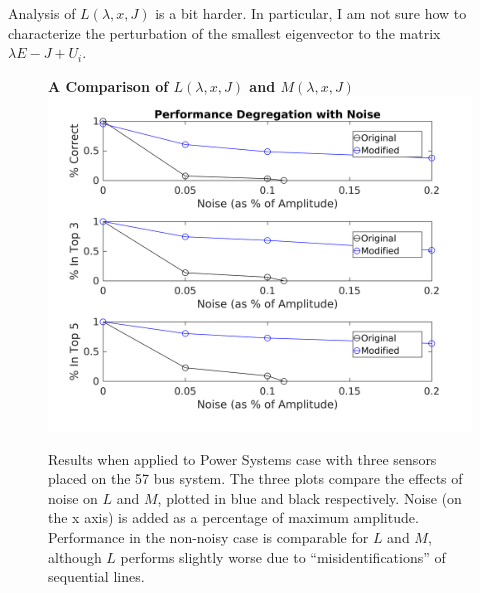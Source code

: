 Analysis of $L(\lambda, x, J)$ is a bit harder. In particular, I am not sure how to characterize the perturbation of the smallest eigenvector to the matrix $\lambda E - J + U_i$. 
\begin{figure}
\centering
\textbf{A Comparison of $L(\lambda,x,J)$ and $M(\lambda,x,J)$}
\includegraphics[width=13cm]{Comparison2.png}
\caption{Results when applied to Power Systems case with three sensors placed on the 57 bus system. The three plots compare the effects of noise on $L$ and $M$, plotted in blue and black respectively. Noise (on the x axis) is added as a percentage of maximum amplitude. Performance in the non-noisy case is comparable for $L$ and $M$, although $L$ performs slightly worse due to ``misidentifications'' of sequential lines. }
\end{figure}

